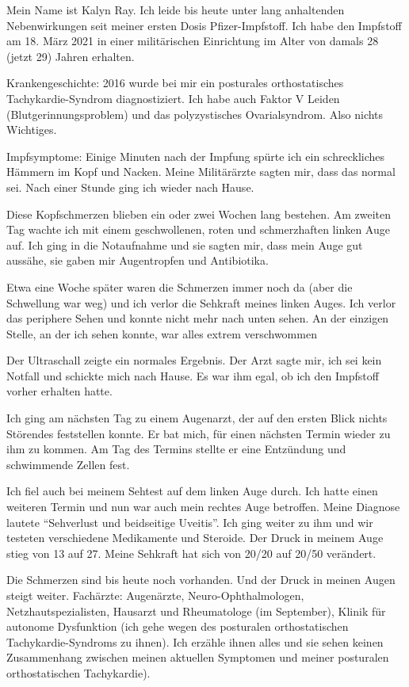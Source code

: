 Mein Name ist Kalyn Ray. Ich leide bis heute unter lang anhaltenden
Nebenwirkungen seit meiner ersten Dosis Pfizer-Impfstoff. Ich habe den Impfstoff
am 18. März 2021 in einer militärischen Einrichtung im Alter von damals 28
(jetzt 29) Jahren erhalten.

Krankengeschichte: 2016 wurde bei mir ein posturales orthostatisches
Tachykardie-Syndrom diagnostiziert. Ich habe auch Faktor V Leiden
(Blutgerinnungsproblem) und das polyzystisches Ovarialsyndrom. Also nichts
Wichtiges.

Impfsymptome: Einige Minuten nach der Impfung spürte ich ein schreckliches
Hämmern im Kopf und Nacken. Meine Militärärzte sagten mir, dass das normal
sei. Nach einer Stunde ging ich wieder nach Hause.

Diese Kopfschmerzen blieben ein oder zwei Wochen lang bestehen. Am zweiten Tag
wachte ich mit einem geschwollenen, roten und schmerzhaften linken Auge auf. Ich
ging in die Notaufnahme und sie sagten mir, dass mein Auge gut aussähe, sie
gaben mir Augentropfen und Antibiotika.

Etwa eine Woche später waren die Schmerzen immer noch da (aber die Schwellung
war weg) und ich verlor die Sehkraft meines linken Auges. Ich verlor das
periphere Sehen und konnte nicht mehr nach unten sehen. An der einzigen Stelle,
an der ich sehen konnte, war alles extrem verschwommen

Der Ultraschall zeigte ein normales Ergebnis. Der Arzt sagte mir, ich sei kein
Notfall und schickte mich nach Hause. Es war ihm egal, ob ich den Impfstoff
vorher erhalten hatte.

Ich ging am nächsten Tag zu einem Augenarzt, der auf den ersten Blick nichts
Störendes feststellen konnte. Er bat mich, für einen nächsten Termin wieder zu
ihm zu kommen. Am Tag des Termins stellte er eine Entzündung und schwimmende
Zellen fest.

Ich fiel auch bei meinem Sehtest auf dem linken Auge durch. Ich hatte einen
weiteren Termin und nun war auch mein rechtes Auge betroffen. Meine Diagnose
lautete “Sehverlust und beidseitige Uveitis”. Ich ging weiter zu ihm und wir
testeten verschiedene Medikamente und Steroide. Der Druck in meinem Auge stieg
von 13 auf 27. Meine Sehkraft hat sich von 20/20 auf 20/50 verändert.

Die Schmerzen sind bis heute noch vorhanden. Und der Druck in meinen Augen
steigt weiter. Fachärzte: Augenärzte, Neuro-Ophthalmologen,
Netzhautspezialisten, Hausarzt und Rheumatologe (im September), Klinik für
autonome Dysfunktion (ich gehe wegen des posturalen orthostatischen
Tachykardie-Syndroms zu ihnen). Ich erzähle ihnen alles und sie sehen keinen
Zusammenhang zwischen meinen aktuellen Symptomen und meiner posturalen
orthostatischen Tachykardie).

